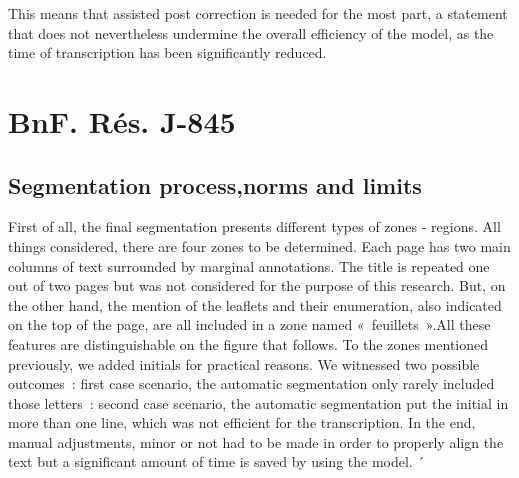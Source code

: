 \documentclass[12pt]{article}
\begin{document}
This means that assisted post correction is needed for the most part, a statement that does not nevertheless undermine the overall efficiency of the model, as the time of transcription has been significantly reduced.


\section{BnF. Rés. J-845}
\subsection{Segmentation process,norms and limits}

First of all, the final segmentation presents different types of zones - regions. All things considered, there are four zones to be determined. Each page has two main columns of text surrounded by marginal annotations. The title is repeated one out of two pages but was not considered for the purpose of this research. But, on the other hand, the mention of the leaflets and their enumeration, also indicated on the top of the page, are all included in a zone named « feuillets ».All these features are distinguishable on the figure that follows. To the zones mentioned previously, we added initials for practical reasons. We witnessed two possible outcomes : first case scenario, the automatic segmentation only rarely included those letters : second case scenario, the automatic segmentation put the initial in more than one line, which was not efficient for the transcription. In the end, manual adjustments, minor or not had to be made in order to properly align the text but a significant amount of time is saved by using the model. 
´
\end{document}
